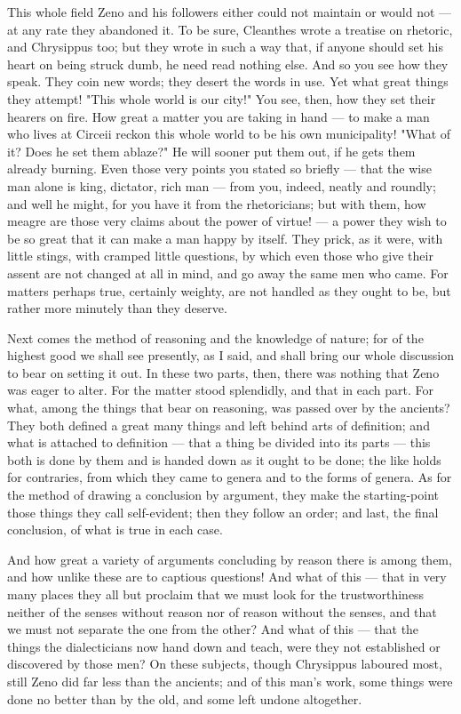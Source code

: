 This whole field Zeno and his followers either could not maintain or would not — at any rate they abandoned it. To be sure, Cleanthes wrote a treatise on rhetoric, and Chrysippus too; but they wrote in such a way that, if anyone should set his heart on being struck dumb, he need read nothing else. And so you see how they speak. They coin new words; they desert the words in use. Yet what great things they attempt! "This whole world is our city!" You see, then, how they set their hearers on fire. How great a matter you are taking in hand — to make a man who lives at Circeii reckon this whole world to be his own municipality! "What of it? Does he set them ablaze?" He will sooner put them out, if he gets them already burning. Even those very points you stated so briefly — that the wise man alone is king, dictator, rich man — from you, indeed, neatly and roundly; and well he might, for you have it from the rhetoricians; but with them, how meagre are those very claims about the power of virtue! — a power they wish to be so great that it can make a man happy by itself. They prick, as it were, with little stings, with cramped little questions, by which even those who give their assent are not changed at all in mind, and go away the same men who came. For matters perhaps true, certainly weighty, are not handled as they ought to be, but rather more minutely than they deserve.

 Next comes the method of reasoning and the knowledge of nature; for of the highest good we shall see presently, as I said, and shall bring our whole discussion to bear on setting it out. In these two parts, then, there was nothing that Zeno was eager to alter. For the matter stood splendidly, and that in each part. For what, among the things that bear on reasoning, was passed over by the ancients? They both defined a great many things and left behind arts of definition; and what is attached to definition — that a thing be divided into its parts — this both is done by them and is handed down as it ought to be done; the like holds for contraries, from which they came to genera and to the forms of genera. As for the method of drawing a conclusion by argument, they make the starting-point those things they call self-evident; then they follow an order; and last, the final conclusion, of what is true in each case.

 And how great a variety of arguments concluding by reason there is among them, and how unlike these are to captious questions! And what of this — that in very many places they all but proclaim that we must look for the trustworthiness neither of the senses without reason nor of reason without the senses, and that we must not separate the one from the other? And what of this — that the things the dialecticians now hand down and teach, were they not established or discovered by those men? On these subjects, though Chrysippus laboured most, still Zeno did far less than the ancients; and of this man's work, some things were done no better than by the old, and some left undone altogether.


